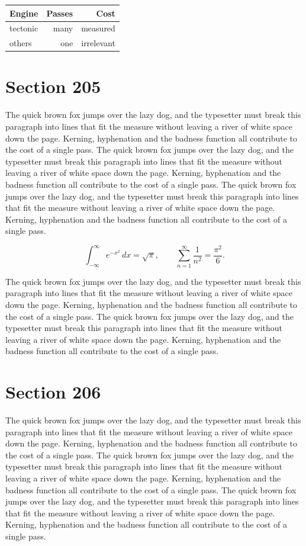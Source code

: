 \documentclass{article}
\begin{document}
\begin{center}
\begin{tabular}{lrr}
\toprule
Engine & Passes & Cost \\
\midrule
tectonic & many & measured \\
others & one & irrelevant \\
\bottomrule
\end{tabular}
\end{center}

\section{Section 205}
The quick brown fox jumps over the lazy dog, and the typesetter must break this paragraph into lines that fit the measure without leaving a river of white space down the page. Kerning, hyphenation and the badness function all contribute to the cost of a single pass. The quick brown fox jumps over the lazy dog, and the typesetter must break this paragraph into lines that fit the measure without leaving a river of white space down the page. Kerning, hyphenation and the badness function all contribute to the cost of a single pass. The quick brown fox jumps over the lazy dog, and the typesetter must break this paragraph into lines that fit the measure without leaving a river of white space down the page. Kerning, hyphenation and the badness function all contribute to the cost of a single pass. 

\begin{equation}
\int_{-\infty}^{\infty} e^{-x^{2}}\,dx = \sqrt{\pi}, \qquad
\sum_{n=1}^{\infty} \frac{1}{n^{2}} = \frac{\pi^{2}}{6}.
\end{equation}

The quick brown fox jumps over the lazy dog, and the typesetter must break this paragraph into lines that fit the measure without leaving a river of white space down the page. Kerning, hyphenation and the badness function all contribute to the cost of a single pass. The quick brown fox jumps over the lazy dog, and the typesetter must break this paragraph into lines that fit the measure without leaving a river of white space down the page. Kerning, hyphenation and the badness function all contribute to the cost of a single pass. 
\section{Section 206}
The quick brown fox jumps over the lazy dog, and the typesetter must break this paragraph into lines that fit the measure without leaving a river of white space down the page. Kerning, hyphenation and the badness function all contribute to the cost of a single pass. The quick brown fox jumps over the lazy dog, and the typesetter must break this paragraph into lines that fit the measure without leaving a river of white space down the page. Kerning, hyphenation and the badness function all contribute to the cost of a single pass. The quick brown fox jumps over the lazy dog, and the typesetter must break this paragraph into lines that fit the measure without leaving a river of white space down the page. Kerning, hyphenation and the badness function all contribute to the cost of a single pass. 
\end{document}
